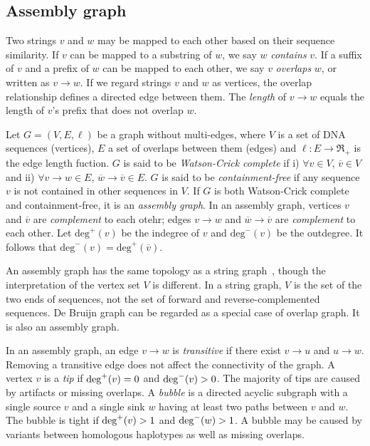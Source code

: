 \documentclass{bioinfo}
\begin{document}
\begin{methods}
\subsection{Assembly graph}

Two strings $v$ and $w$ may be mapped to each other based on their sequence
similarity. If $v$ can be mapped to a substring of $w$, we say $w$
\emph{contains} $v$. If a suffix of $v$ and a prefix of $w$ can be mapped to
each other, we say $v$ \emph{overlaps} $w$, or written as $v\to w$.
If we regard strings $v$ and $w$ as vertices, the overlap relationship defines
a directed edge between them. The \emph{length} of $v\to w$ equals the length
of $v$'s prefix that does not overlap $w$.

Let $G=(V,E,\ell)$ be a graph without multi-edges, where $V$ is a
set of DNA sequences (vertices), $E$ a set of overlaps between them (edges) and
$\ell:E\to\Re_+$ is the edge length fuction. $G$ is said to be
\emph{Watson-Crick complete} if i) $\forall v\in V$, $\overline{v}\in V$ and
ii) $\forall v\to w\in E$, $\overline{w}\to\overline{v}\in E$. $G$ is said to
be \emph{containment-free} if any sequence $v$ is not contained in other
sequences in $V$. If $G$ is both Watson-Crick complete and containment-free, it
is an \emph{assembly graph}. In an assembly graph, vertices $v$ and
$\overline{v}$ are \emph{complement} to each otehr; edges $v\to w$ and
$\overline{w}\to\overline{v}$ are \emph{complement} to each other. Let
$\mathrm{deg}^+(v)$ be the indegree of $v$ and $\mathrm{deg}^-(v)$ be the
outdegree. It follows that $\mathrm{deg}^-(v)=\mathrm{deg}^+(\overline{v})$.

An assembly graph has the same topology as a string graph~\citep{Myers:2005bh},
though the interpretation of the vertex set $V$ is different. In a string
graph, $V$ is the set of the two ends of sequences, not the set of forward and
reverse-complemented sequences. De Bruijn graph can be regarded as a special
case of overlap graph. It is also an assembly graph.

In an assembly graph, an edge $v\to w$ is \emph{transitive} if there exist
$v\to u$ and $u\to w$. Removing a transitive edge does not affect the
connectivity of the graph. A vertex $v$ is a \emph{tip} if ${\rm deg}^+(v)=0$
and ${\rm deg}^-(v)>0$. The majority of tips are caused by artifacts or missing
overlaps. A \emph{bubble} is a directed acyclic subgraph with a single source
$v$ and a single sink $w$ having at least two paths between $v$ and $w$. The
bubble is tight if ${\rm deg}^+(v)>1$ and ${\rm deg}^-(w)>1$. A bubble may be
caused by variants between homologous haplotypes as well as missing overlaps.


\end{methods}
\end{document}
